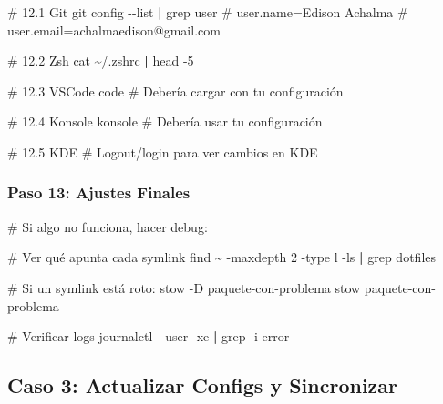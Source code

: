 \documentclass[
  doc,
  floatsintext,
  longtable,
  a4paper,
  nolmodern,
  notxfonts,
  notimes,
  12pt,
  colorlinks=true,linkcolor=blue,citecolor=blue,urlcolor=blue]{apa7}
\newenvironment{Shaded}{\begin{snugshade}}{\end{snugshade}}
\newcommand{\AttributeTok}[1]{\textcolor[rgb]{0.40,0.45,0.13}{#1}}
\newcommand{\CommentTok}[1]{\textcolor[rgb]{0.37,0.37,0.37}{#1}}
\newcommand{\ExtensionTok}[1]{\textcolor[rgb]{0.00,0.23,0.31}{#1}}
\newcommand{\FunctionTok}[1]{\textcolor[rgb]{0.28,0.35,0.67}{#1}}
\newcommand{\KeywordTok}[1]{\textcolor[rgb]{0.00,0.23,0.31}{\textbf{#1}}}
\newcommand{\NormalTok}[1]{\textcolor[rgb]{0.00,0.23,0.31}{#1}}
\begin{document}
\begin{Shaded}
\begin{Highlighting}[]
\CommentTok{\# 12.1 Git}
\FunctionTok{git}\NormalTok{ config }\AttributeTok{{-}{-}list} \KeywordTok{|} \FunctionTok{grep}\NormalTok{ user}
\CommentTok{\# user.name=Edison Achalma}
\CommentTok{\# user.email=achalmaedison@gmail.com}

\CommentTok{\# 12.2 Zsh}
\FunctionTok{cat}\NormalTok{ \textasciitilde{}/.zshrc }\KeywordTok{|} \FunctionTok{head} \AttributeTok{{-}5}

\CommentTok{\# 12.3 VSCode}
\ExtensionTok{code}
\CommentTok{\# Debería cargar con tu configuración}

\CommentTok{\# 12.4 Konsole}
\ExtensionTok{konsole}
\CommentTok{\# Debería usar tu configuración}

\CommentTok{\# 12.5 KDE}
\CommentTok{\# Logout/login para ver cambios en KDE}
\end{Highlighting}
\end{Shaded}

\subsubsection{Paso 13: Ajustes Finales}\label{paso-13-ajustes-finales}

\begin{Shaded}
\begin{Highlighting}[]
\CommentTok{\# Si algo no funciona, hacer debug:}

\CommentTok{\# Ver qué apunta cada symlink}
\FunctionTok{find}\NormalTok{ \textasciitilde{} }\AttributeTok{{-}maxdepth}\NormalTok{ 2 }\AttributeTok{{-}type}\NormalTok{ l }\AttributeTok{{-}ls} \KeywordTok{|} \FunctionTok{grep}\NormalTok{ dotfiles}

\CommentTok{\# Si un symlink está roto:}
\ExtensionTok{stow} \AttributeTok{{-}D}\NormalTok{ paquete{-}con{-}problema}
\ExtensionTok{stow}\NormalTok{ paquete{-}con{-}problema}

\CommentTok{\# Verificar logs}
\ExtensionTok{journalctl} \AttributeTok{{-}{-}user} \AttributeTok{{-}xe} \KeywordTok{|} \FunctionTok{grep} \AttributeTok{{-}i}\NormalTok{ error}
\end{Highlighting}
\end{Shaded}

\subsection{Caso 3: Actualizar Configs y
Sincronizar}\label{caso-3-actualizar-configs-y-sincronizar}
\end{document}
